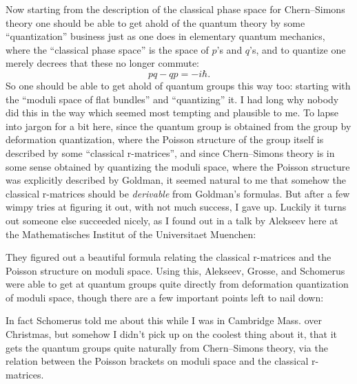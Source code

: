\documentclass{article}
\def\tightlist{}
\renewcommand{\texttt}[1]{%
  \begingroup
  \ttfamily
  \begingroup\lccode`~=`/\lowercase{\endgroup\def~}{/\discretionary{}{}{}}%
  \begingroup\lccode`~=`[\lowercase{\endgroup\def~}{[\discretionary{}{}{}}%
  \begingroup\lccode`~=`.\lowercase{\endgroup\def~}{.\discretionary{}{}{}}%
  \catcode`/=\active\catcode`[=\active\catcode`.=\active
  \scantokens{#1\noexpand}%
  \endgroup
}
\begin{document}
Now starting from the description of the classical phase space for
Chern--Simons theory one should be able to get ahold of the quantum
theory by some ``quantization'' business just as one does in elementary
quantum mechanics, where the ``classical phase space'' is the space of
\(p\)'s and \(q\)'s, and to quantize one merely decrees that these no
longer commute: \[pq-qp = -i \hbar.\] So one should be able to get ahold
of quantum groups this way too: starting with the ``moduli space of flat
bundles'' and ``quantizing'' it. I had long why nobody did this in the
way which seemed most tempting and plausible to me. To lapse into jargon
for a bit here, since the quantum group is obtained from the group by
deformation quantization, where the Poisson structure of the group
itself is described by some ``classical r-matrices'', and since
Chern--Simons theory is in some sense obtained by quantizing the moduli
space, where the Poisson structure was explicitly described by Goldman,
it seemed natural to me that somehow the classical r-matrices should be
\emph{derivable} from Goldman's formulas. But after a few wimpy tries at
figuring it out, with not much success, I gave up. Luckily it turns out
someone else succeeded nicely, as I found out in a talk by Alekseev here
at the Mathematisches Institut of the Universitaet Muenchen:

\noindent
They figured out a beautiful formula relating the classical r-matrices
and the Poisson structure on moduli space. Using this, Alekseev, Grosse,
and Schomerus were able to get at quantum groups quite directly from
deformation quantization of moduli space, though there are a few
important points left to nail down:

\noindent
In fact Schomerus told me about this while I was in Cambridge Mass. over
Christmas, but somehow I didn't pick up on the coolest thing about it,
that it gets the quantum groups quite naturally from Chern--Simons
theory, via the relation between the Poisson brackets on moduli space
and the classical r-matrices.
\end{document}
